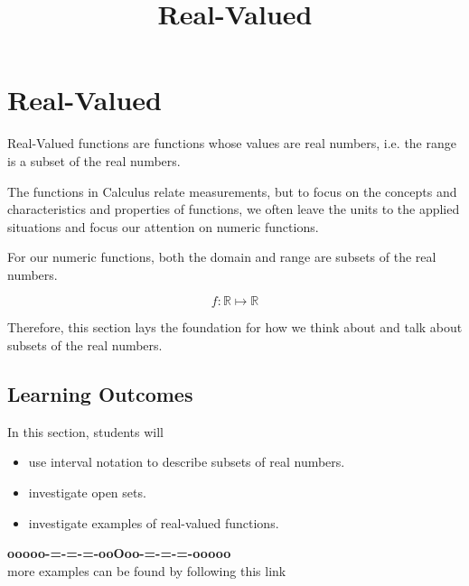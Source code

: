 \documentclass{ximera}
\title{Real-Valued}
\begin{document}
\begin{abstract}
\end{abstract}
\maketitle




\section*{Real-Valued}


Real-Valued functions are functions whose values are real numbers, i.e. the range is a subset of the real numbers. 


The functions in Calculus relate measurements, but to focus on the concepts and characteristics and properties of functions, we often leave the units to the applied situations and focus our attention on numeric functions. 


For our numeric functions, both the domain and range are subsets of the real numbers. 

\[
f : \mathbb{R} \mapsto \mathbb{R}
\]


Therefore, this section lays the foundation for how we think about and talk about subsets of the real numbers.










\subsection*{Learning Outcomes}





\begin{sectionOutcomes}
In this section, students will 

\begin{itemize}
\item use interval notation to describe subsets of real numbers.
\item investigate open sets.
\item investigate examples of real-valued functions.
\end{itemize}
\end{sectionOutcomes}










\begin{center}
\textbf{\textcolor{green!50!black}{ooooo-=-=-=-ooOoo-=-=-=-ooooo}} \\

more examples can be found by following this link\\ 

\end{center}
\end{document}
